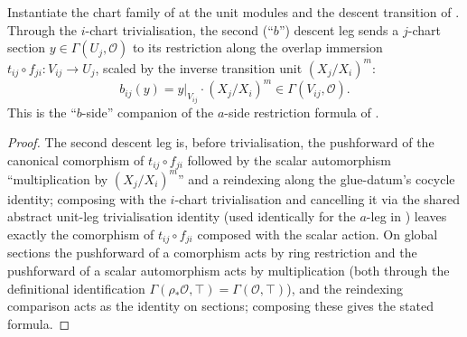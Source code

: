 \begin{lemma}\leanok
  \label{lem:serre_twist_b_leg}
  Instantiate the chart family of  at the unit
  modules and the descent transition of . Through the
  \(i\)-chart trivialisation, the second (``\(b\)'') descent leg sends a
  \(j\)-chart section \(y \in \Gamma(U_j, \mathcal O)\) to its restriction
  along the overlap immersion \(t_{ij} \circ f_{ji} : V_{ij} \to U_j\), scaled
  by the inverse transition unit \((X_j/X_i)^m\):
  \[
    b_{ij}(y) = y|_{V_{ij}} \cdot (X_j/X_i)^m \in \Gamma(V_{ij}, \mathcal O).
  \]
  This is the ``\(b\)-side'' companion of the \(a\)-side restriction formula
  of .
\end{lemma}
\begin{proof}\leanok
  The second descent leg is, before trivialisation, the pushforward of the
  canonical comorphism of \(t_{ij} \circ f_{ji}\) followed by the scalar
  automorphism ``multiplication by \((X_j/X_i)^m\)'' and a reindexing along
  the glue-datum's cocycle identity; composing with the \(i\)-chart
  trivialisation and cancelling it via the shared abstract unit-leg
  trivialisation identity (used identically for the \(a\)-leg in
  ) leaves exactly the comorphism of
  \(t_{ij} \circ f_{ji}\) composed with the scalar action. On global
  sections the pushforward of a comorphism acts by ring restriction and the
  pushforward of a scalar automorphism acts by multiplication (both
  through the definitional identification \(\Gamma(\rho_* \mathcal O, \top) =
  \Gamma(\mathcal O, \top)\)), and the reindexing comparison acts as the
  identity on sections; composing these gives the stated formula.
\end{proof}

